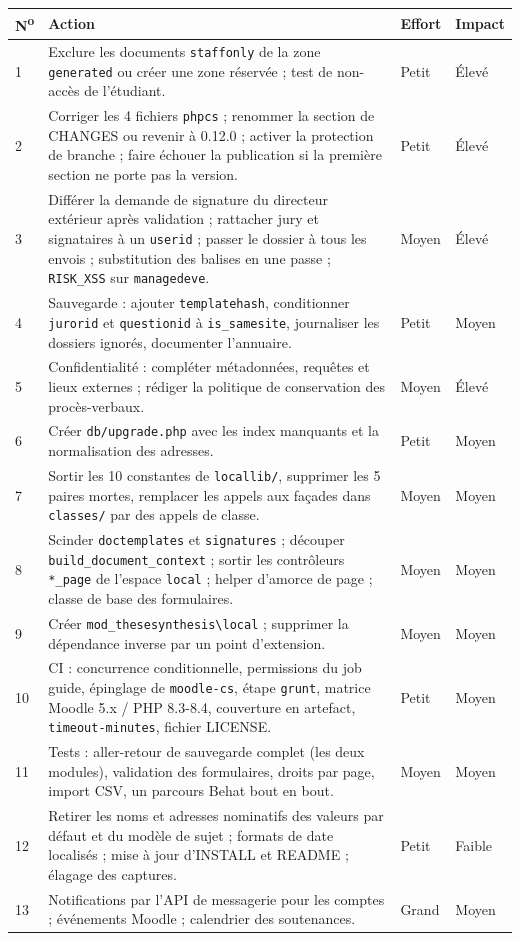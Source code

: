 \documentclass[11pt,a4paper]{article}
\newcommand{\fichier}[1]{\texttt{\small #1}}
\newcommand{\code}[1]{\texttt{#1}}
\begin{document}
\begin{longtable}{@{}p{0.6cm}p{11.2cm}p{1.6cm}p{1.6cm}@{}}
\toprule
\textbf{N\textsuperscript{o}} & \textbf{Action} & \textbf{Effort} & \textbf{Impact} \\
\midrule
\endhead
1 & Exclure les documents \code{staffonly} de la zone \code{generated} ou créer une zone
    réservée ; test de non-accès de l'étudiant. & Petit & Élevé \\
2 & Corriger les 4 fichiers \code{phpcs} ; renommer la section de CHANGES ou revenir à 0.12.0 ;
    activer la protection de branche ; faire échouer la publication si la première section ne
    porte pas la version. & Petit & Élevé \\
3 & Différer la demande de signature du directeur extérieur après validation ; rattacher jury
    et signataires à un \code{userid} ; passer le dossier à tous les envois ; substitution des
    balises en une passe ; \code{RISK\_XSS} sur \code{managedeve}. & Moyen & Élevé \\
4 & Sauvegarde : ajouter \code{templatehash}, conditionner \code{jurorid} et \code{questionid}
    à \code{is\_samesite}, journaliser les dossiers ignorés, documenter l'annuaire. & Petit &
    Moyen \\
5 & Confidentialité : compléter métadonnées, requêtes et lieux externes ; rédiger la politique de
    conservation des procès-verbaux. & Moyen & Élevé \\
6 & Créer \fichier{db/upgrade.php} avec les index manquants et la normalisation des adresses. &
    Petit & Moyen \\
7 & Sortir les 10 constantes de \fichier{locallib/}, supprimer les 5 paires mortes, remplacer
    les appels aux façades dans \fichier{classes/} par des appels de classe. & Moyen & Moyen \\
8 & Scinder \code{doctemplates} et \code{signatures} ; découper
    \code{build\_document\_context} ; sortir les contrôleurs \code{*\_page} de l'espace
    \code{local} ; helper d'amorce de page ; classe de base des formulaires. & Moyen & Moyen \\
9 & Créer \code{mod\_thesesynthesis\textbackslash local} ; supprimer la dépendance inverse par
    un point d'extension. & Moyen & Moyen \\
10 & CI : concurrence conditionnelle, permissions du job guide, épinglage de
    \code{moodle-cs}, étape \code{grunt}, matrice Moodle 5.x / PHP 8.3-8.4, couverture en
    artefact, \code{timeout-minutes}, fichier LICENSE. & Petit & Moyen \\
11 & Tests : aller-retour de sauvegarde complet (les deux modules), validation des formulaires,
    droits par page, import CSV, un parcours Behat bout en bout. & Moyen & Moyen \\
12 & Retirer les noms et adresses nominatifs des valeurs par défaut et du modèle de sujet ;
    formats de date localisés ; mise à jour d'INSTALL et README ; élagage des captures. & Petit
    & Faible \\
13 & Notifications par l'API de messagerie pour les comptes ; événements Moodle ; calendrier des
    soutenances. & Grand & Moyen \\
\bottomrule
\end{longtable}
\end{document}
